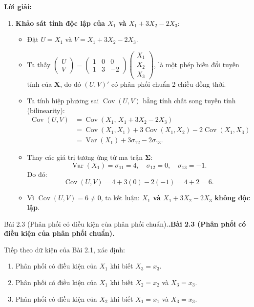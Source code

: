 \documentclass[11pt,a4paper]{article}
\makeatletter
\newcounter{prob}
\newenvironment{problem}[1][]{%
  \par\medskip\noindent
  \def\@tempa{#1}%
  \ifx\@tempa\@empty\refstepcounter{prob}\textbf{\theprob.}\else\textbf{#1}\fi
  \ \ignorespaces
}{\par}
\newenvironment{solution}{%
  \par\noindent\textbf{Lời giải:}\ \ignorespaces
}{\par}
\theoremstyle{definition}
\makeatother
\begin{document}
\begin{solution}
\begin{enumerate}[label=\textbf{\alph*)}]
  \item \textbf{Khảo sát tính độc lập của $X_1$ và $X_1 + 3X_2 - 2X_3$}:
  \begin{itemize}
    \item Đặt $U = X_1$ và $V = X_1 + 3X_2 - 2X_3$.
    \item Ta thấy $\begin{pmatrix} U \\ V \end{pmatrix} = \begin{pmatrix} 1 & 0 & 0 \\ 1 & 3 & -2 \end{pmatrix} \begin{pmatrix} X_1 \\ X_2 \\ X_3 \end{pmatrix}$, là một phép biến đổi tuyến tính của $\mathbf{X}$, do đó $(U, V)'$ có phân phối chuẩn 2 chiều đồng thời.
    \item Ta tính hiệp phương sai $\operatorname{Cov}(U, V)$ bằng tính chất song tuyến tính (bilinearity):
    \begin{align*}
      \operatorname{Cov}(U, V) &= \operatorname{Cov}\left(X_1, \, X_1 + 3X_2 - 2X_3\right) \\
      &= \operatorname{Cov}(X_1, X_1) + 3\operatorname{Cov}(X_1, X_2) - 2\operatorname{Cov}(X_1, X_3) \\
      &= \operatorname{Var}(X_1) + 3\sigma_{12} - 2\sigma_{13}.
    \end{align*}
    \item Thay các giá trị tương ứng từ ma trận $\boldsymbol{\Sigma}$:
    \[
    \operatorname{Var}(X_1) = \sigma_{11} = 4, \quad \sigma_{12} = 0, \quad \sigma_{13} = -1.
    \]
    Do đó:
    \[
    \operatorname{Cov}(U, V) = 4 + 3(0) - 2(-1) = 4 + 2 = 6.
    \]
    \item Vì $\operatorname{Cov}(U, V) = 6 \neq 0$, ta kết luận: \textbf{$X_1$ và $X_1 + 3X_2 - 2X_3$ không độc lập}.
  \end{itemize}
\end{enumerate}
\end{solution}

\begin{problem}[Bài 2.3 (Phân phối có điều kiện của phân phối chuẩn).]
Tiếp theo dữ kiện của Bài 2.1, xác định:
\begin{enumerate}[label=\alph*)]
  \item Phân phối có điều kiện của $X_1$ khi biết $X_3 = x_3$.
  \item Phân phối có điều kiện của $X_1$ khi biết $X_2 = x_2$ và $X_3 = x_3$.
  \item Phân phối có điều kiện của $X_2$ khi biết $X_1 = x_1$ và $X_3 = x_3$.
\end{enumerate}
\end{problem}
\end{document}
